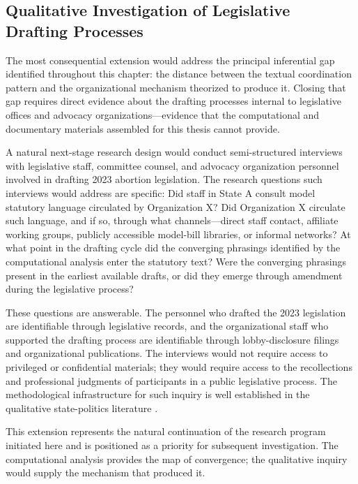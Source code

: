 \subsection{Qualitative Investigation of Legislative Drafting Processes}
\label{subsec:future-qualitative}

The most consequential extension would address the principal inferential gap identified throughout this chapter: the distance between the textual coordination pattern and the organizational mechanism theorized to produce it. Closing that gap requires direct evidence about the drafting processes internal to legislative offices and advocacy organizations---evidence that the computational and documentary materials assembled for this thesis cannot provide.

A natural next-stage research design would conduct semi-structured interviews with legislative staff, committee counsel, and advocacy organization personnel involved in drafting 2023 abortion legislation. The research questions such interviews would address are specific: Did staff in State A consult model statutory language circulated by Organization X? Did Organization X circulate such language, and if so, through what channels---direct staff contact, affiliate working groups, publicly accessible model-bill libraries, or informal networks? At what point in the drafting cycle did the converging phrasings identified by the computational analysis enter the statutory text? Were the converging phrasings present in the earliest available drafts, or did they emerge through amendment during the legislative process?

These questions are answerable. The personnel who drafted the 2023 legislation are identifiable through legislative records, and the organizational staff who supported the drafting process are identifiable through lobby-disclosure filings and organizational publications. The interviews would not require access to privileged or confidential materials; they would require access to the recollections and professional judgments of participants in a public legislative process. The methodological infrastructure for such inquiry is well established in the qualitative state-politics literature \parencite{hertel-fernandezStateCapture2019}.

This extension represents the natural continuation of the research program initiated here and is positioned as a priority for subsequent investigation. The computational analysis provides the map of convergence; the qualitative inquiry would supply the mechanism that produced it.

